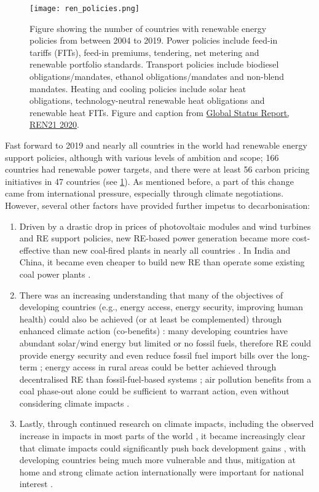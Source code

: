 \documentclass[../thesis.tex]{subfiles}
\begin{document}
\begin{figure}[h!]
\centering
\texttt{[image: ren\_policies.png]}
\caption{Figure showing the number of countries with renewable energy policies from between 2004 to 2019. Power policies include feed-in tariffs (FITs), feed-in premiums, tendering, net metering and renewable portfolio standards. Transport policies include biodiesel obligations/mandates, ethanol obligations/mandates and non-blend mandates. Heating and cooling policies include solar heat obligations, technology-neutral renewable heat obligations and renewable heat FITs.  Figure and caption from \href{https://www.ren21.net/reports/global-status-report}{Global Status Report, REN21 2020}.}
\label{fig:ren21}
\end{figure}

Fast forward to 2019 and nearly all countries in the world had renewable energy support policies, although with various levels of ambition and scope; 166 countries had renewable power targets, and there were at least 56 carbon pricing initiatives in 47 countries (see \cref{fig:ren21}). As mentioned before, a part of this change came from international pressure, especially through climate negotiations. However, several other factors have provided further impetus to decarbonisation:
\begin{enumerate}
\item Driven by a drastic drop in prices of photovoltaic modules and wind turbines and RE support policies, new RE-based power generation became more cost-effective than new coal-fired plants in nearly all countries \citep{ren212020}. In India and China, it became even cheaper to build new RE than operate some existing coal power plants \citep{runyon2021}.
\item There was an increasing understanding that many of the objectives of developing countries (e.g., energy access, energy security, improving human health) could also be achieved (or at least be complemented) through enhanced climate action (co-benefits) \citep{dubash2013politics}: many developing countries have abundant solar/wind energy but limited or no fossil fuels, therefore RE could provide energy security and even reduce fossil fuel import bills over the long-term \citep{iea2021}; energy access in rural areas could be better achieved through decentralised RE than fossil-fuel-based systems \citep{arent2017}; air pollution benefits from a coal phase-out alone could be sufficient to warrant action, even without considering climate impacts \citep{rauner2020}.
\item Lastly, through continued research on climate impacts, including the observed increase in impacts in most parts of the world \citep{williams2019}, it became increasingly clear that climate impacts could significantly push back development gains \citep{dubash2019}, with developing countries being much more vulnerable and thus, mitigation at home and strong climate action internationally were important for national interest \citep{thaker2014shifting}. 
\end{enumerate}
\end{document}
